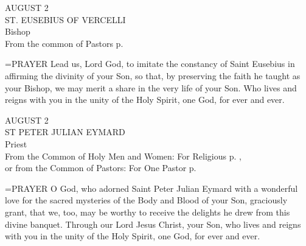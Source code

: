 \begin{center}\normalsize AUGUST 2\\
\footnotesize ST. EUSEBIUS OF VERCELLI\\
\footnotesize Bishop\\
\footnotesize From the common of Pastors p. \\
\end{center}

\hangindent=\parindent \small{PRAYER 
Lead us, Lord God, to imitate the constancy of Saint Eusebius
in affirming the divinity of your Son,
so that, by preserving the faith he taught as your Bishop,
we may merit a share in the very life of your Son.
Who lives and reigns with you in the unity of the Holy Spirit,
one God, for ever and ever.\\}
 
\begin{center}\normalsize AUGUST 2\\
\footnotesize ST PETER JULIAN EYMARD\\
\footnotesize Priest\\
\footnotesize From the Common of Holy Men and Women: For Religious p.    , \\
\footnotesize or from the Common of Pastors: For One Pastor p.\\
\end{center}

\hangindent=\parindent \small{PRAYER 
O God, who adorned Saint Peter Julian Eymard
with a wonderful love for the sacred mysteries
of the Body and Blood of your Son,
graciously grant,
that we, too, may be worthy to receive
the delights he drew from this divine banquet.
Through our Lord Jesus Christ, your Son,
who lives and reigns with you in the unity of the Holy Spirit,
one God, for ever and ever.\\}
 
